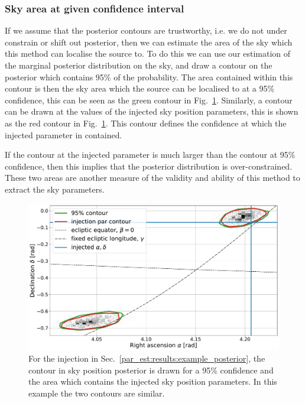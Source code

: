 %
%
\subsubsection{\label{par_est:results:simulations:skyarea}Sky area at given confidence interval}
%
%

If we assume that the posterior contours are trustworthy, i.e. we do not under constrain or
shift out posterior, then we can estimate the area of the sky which this method can
localise the source to.  To do this we can use our estimation of the marginal
posterior distribution on the sky, and draw a contour on the posterior which
contains 95\% of the probability.  The area contained within this contour is
then the sky area which the source can be localised to at a 95\% confidence,
this can be seen as the green contour in
Fig.~\ref{par_est:results:sky_area_example}.  Similarly, a contour can be drawn
at the values of the injected sky position parameters, this is shown as the red contour in
Fig.~\ref{par_est:results:sky_area_example}. 
This contour defines the confidence at which the injected parameter in contained.

If the contour at the injected parameter is much larger than the contour at 95\%
confidence, then this implies that the posterior distribution is over-constrained.  These two areas are another measure of the validity and ability of this
method to extract the sky parameters. 
%
\begin{figure}[ht]
    \centering
    \includegraphics[width=\linewidth]{C5_parameter/skyarea_example.pdf}
    \caption[Area of sky at 95\% confidence]{For the injection in
Sec.~\ref{par_est:results:example_posterior}, the contour in sky position
posterior is drawn for a 95\% confidence and the area which contains the
injected sky position parameters. In this example the two contours are
similar.} \label{par_est:results:sky_area_example}
\end{figure}


